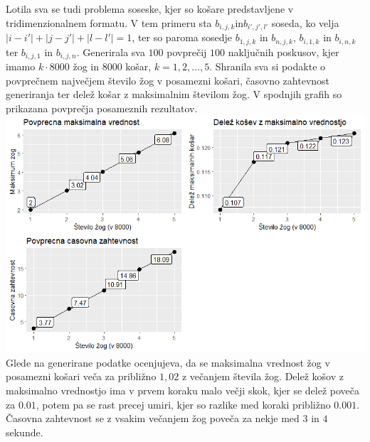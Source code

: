 \documentclass[a4paper, 11pt]{article}
\begin{document}
Lotila sva se tudi problema soseske, kjer so košare predstavljene v tridimenzionalnem formatu.
V tem primeru sta $b_{i,j,k} $in$ b_{i',j',l'}$ soseda, ko velja $|i-i'|+|j-j'|+|l-l'| = 1$, ter so paroma sosedje 
$b_{1,j,k} $ in $b_{n,j,k}$, $b_{i,1,k} $ in $b_{i,n,k}$ ter $b_{i,j,1} $ in $b_{i,j,n}$.
\linebreak
Generirala sva $100$ povprečij $100$ naključnih poskusov, kjer imamo $k \cdot 8000$ žog in $8000$ košar, $k=1,2, \dots, 5$. 
Shranila sva si podakte o povprečnem največjem število žog v posamezni košari, časovno zahtevnost generiranja ter delež košar z 
maksimalnim številom žog. V spodnjih grafih so prikazana povprečja posameznih rezultatov. 
\bigbreak
\includegraphics[scale=0.65]{graf_3d1.png}
\\
Glede na generirane podatke ocenjujeva, da se maksimalna vrednost žog v posamezni košari veča za približno $1,02$ z večanjem
števila žog. Delež košov z maksimalno vrednostjo ima v prvem koraku malo večji skok, kjer se delež poveča za 
$0.01$, potem pa se rast precej umiri, kjer so razlike med koraki približno $0.001$. Časovna zahtevnost se z vsakim večanjem žog poveča za nekje med $3$ in $4$ sekunde.
\end{document}
